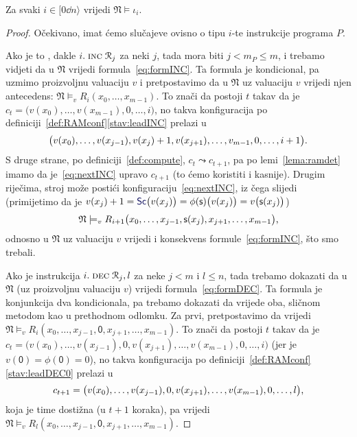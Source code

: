 \begin{lema}[{name=[istinitost instrukcijskih formula u $\mathfrak N$]}]\label{lm:Niotai}
Za svaki $i\in[0\dd n\rangle$ vrijedi $\mathfrak N\models\iota_i$.
\end{lema}
\begin{proof}
Očekivano, imat ćemo slučajeve ovisno o tipu $i$-te instrukcije programa $P$.

Ako je to \inc, dakle $i.\;\textsc{inc}\;\mathcal R_{j}$ za neki $j$, tada mora biti $j<m_P\le m$, i trebamo vidjeti da u $\mathfrak N$ vrijedi formula~\eqref{eq:formINC}. Ta formula je kondicional, pa uzmimo proizvoljnu valuaciju $v$ i pretpostavimo da u $\mathfrak N$ uz valuaciju $v$ vrijedi njen antecedens: $\mathfrak N\models_v R_i(x_0,\dotsc,x_{m-1})$. To znači da postoji $t$ takav da je $c_t=\bigl(v(x_0),\dotsc,v(x_{m-1}),0,\dotsc,i\bigr)$, no takva konfiguracija po definiciji~\ref{def:RAMconf}\eqref{stav:leadINC} prelazi u
\begin{equation}\label{eq:nextINC}
    \bigl(v(x_0),\dotsc,v(x_{j-1}),v(x_j)+1,v(x_{j+1}),\dotsc,v_{m-1},0,\dotsc,i+1\bigr)\text.
\end{equation}
S druge strane, po definiciji~\ref{def:compute}, $c_t\leadsto c_{t+1}$, pa po lemi~\ref{lema:ramdet} imamo da je~\eqref{eq:nextINC} upravo $c_{t+1}$ (to ćemo koristiti i kasnije). Drugim riječima, stroj može postići konfiguraciju~\eqref{eq:nextINC}, iz čega slijedi (primijetimo da je $v(x_j)+1=\f{Sc}\bigl(v(x_j)\bigr)=\phi(\mathsf s)\bigl(v(x_j)\bigr)=v\bigl(\mathsf s(x_j)\bigr)$)
\begin{equation}
    \mathfrak N\models_v R_{i+1}\bigl(x_0,\dotsc,x_{j-1},\mathsf s(x_j),x_{j+1},\dotsc,x_{m-1}\bigr)\text,
\end{equation}
odnosno u $\mathfrak N$ uz valuaciju $v$ vrijedi i konsekvens formule~\eqref{eq:formINC}, što smo trebali.

Ako je instrukcija $i.\;\textsc{dec}\;\mathcal R_{j},l$ za neke $j<m$ i $l\le n$, tada trebamo dokazati da u $\mathfrak N$ (uz proizvoljnu valuaciju $v$) vrijedi formula~\eqref{eq:formDEC}. Ta formula je konjunkcija dva kondicionala, pa trebamo dokazati da vrijede oba, sličnom metodom kao u prethodnom odlomku. Za prvi, pretpostavimo da vrijedi $\mathfrak N\models_v R_i(x_0,\dotsc,x_{j-1},\mathsf0,x_{j+1},\dotsc,x_{m-1})$. To znači da postoji $t$ takav da je $c_t=\bigl(v(x_0),\dotsc,v(x_{j-1}),0,v(x_{j+1}),\dotsc,v(x_{m-1}),0,\dotsc,i\bigr)$ (jer je $v(\mathsf0)=\phi(\mathsf0)=0$), no takva konfiguracija po definiciji~\ref{def:RAMconf}\eqref{stav:leadDEC0} prelazi u
\begin{equation}
    c_{t+1}=\bigl(v(x_0),\dotsc,v(x_{j-1}),0,v(x_{j+1}),\dotsc,v(x_{m-1}),0,\dotsc,l\bigr)\text,
\end{equation}
koja je time dostižna (u $t+1$ koraka), pa vrijedi $\mathfrak N\models_v R_l(x_0,\dotsc,x_{j-1},\mathsf0,x_{j+1},\dotsc,x_{m-1})$.


\end{proof}
